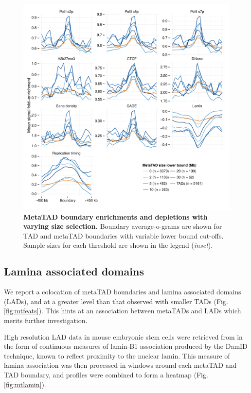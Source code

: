 \documentclass[a4paper,11pt,oneside]{book}
\begin{document}
\begin{figure}
\begin{center} 
\includegraphics[width=4.5in]{metatad_cutoffenrich.pdf}
\captionsetup{width=\textwidth}
\caption[MetaTAD boundary enrichments and depletions with varying size selection.]{ {\bf MetaTAD boundary enrichments and depletions with varying size selection. }
Boundary average-o-grams are shown for TAD and metaTAD boundaries with variable lower bound cut-offs. Sample sizes for each threshold are shown in the legend (\emph{inset}).
}\label{fig:mtcutoffenrich}
\end{center}
\end{figure} 

\subsection{Lamina associated domains}\label{sec:mtlads}

We report a colocation of metaTAD boundaries and lamina associated domains (LADs), and at a greater level than that observed with smaller TADs (Fig. \ref{fig:mtfeats}). This hints at an association between metaTADs and LADs which merits further investigation.

High resolution LAD data in mouse embryonic stem cells were retrieved from \citet{Peric-Hupkes2010} in the form of continuous measures of lamin-B1 association produced by the DamID technique, known to reflect proximity to the nuclear lamin.\cite{Pickersgill2006} This measure of lamina association was then processed in windows around each metaTAD and TAD boundary, and profiles were combined to form a heatmap (Fig. \ref{fig:mtlamin}).
\end{document}
